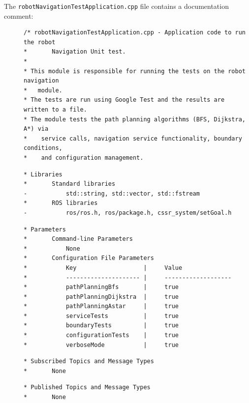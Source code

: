 \documentclass{CSSRforAfrica}
\newcommand{\checkboxChecked}{\fbox{\ding{51}}} %
\begin{document}
\noindent The {\small \verb+robotNavigationTestApplication.cpp+} file contains a documentation comment:

\begin{description}

\item[\checkboxChecked] 
 {\small 
\begin{verbatim}
/* robotNavigationTestApplication.cpp - Application code to run the robot
*       Navigation Unit test.
*
* This module is responsible for running the tests on the robot navigation
*   module.
* The tests are run using Google Test and the results are written to a file. 
* The module tests the path planning algorithms (BFS, Dijkstra, A*) via
*    service calls, navigation service functionality, boundary conditions,
*    and configuration management.
\end{verbatim}}

\item[\checkboxChecked] 
 {\small 
\begin{verbatim}
* Libraries
*       Standard libraries
-           std::string, std::vector, std::fstream
*       ROS libraries
-           ros/ros.h, ros/package.h, cssr_system/setGoal.h
\end{verbatim}}

\item[\checkboxChecked] 
 {\small 
\begin{verbatim}
* Parameters
*       Command-line Parameters
*           None
*       Configuration File Parameters
*           Key                   |     Value 
*           --------------------- |     -------------------
*           pathPlanningBfs       |     true
*           pathPlanningDijkstra  |     true
*           pathPlanningAstar     |     true
*           serviceTests          |     true
*           boundaryTests         |     true
*           configurationTests    |     true
*           verboseMode           |     true
\end{verbatim}}

\item[\checkboxChecked] 
 {\small 
\begin{verbatim}
* Subscribed Topics and Message Types
*       None
\end{verbatim}}

\item[\checkboxChecked] 
 {\small 
\begin{verbatim}                    
* Published Topics and Message Types
*       None
\end{verbatim}}


\end{description}
\end{document}

